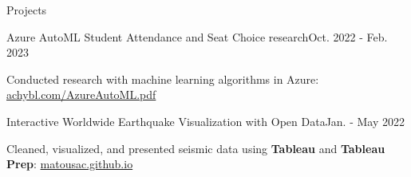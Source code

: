 \begin{rSection}{Projects}
	\begin{project}{Azure AutoML Student Attendance and Seat Choice research}{Oct. 2022 - Feb. 2023}
		\item Conducted research with machine learning algorithms in Azure: \href{https://achybl.com/AzureAutoML.pdf}{achybl.com/AzureAutoML.pdf}
	\end{project}
  \begin{project}{Interactive Worldwide Earthquake Visualization with Open Data}{Jan. - May 2022}
		\item Cleaned, visualized, and presented seismic data using {\bf Tableau} and {\bf Tableau Prep}: \href{https://matousac.github.io/}{matousac.github.io}
	\end{project}
\end{rSection}